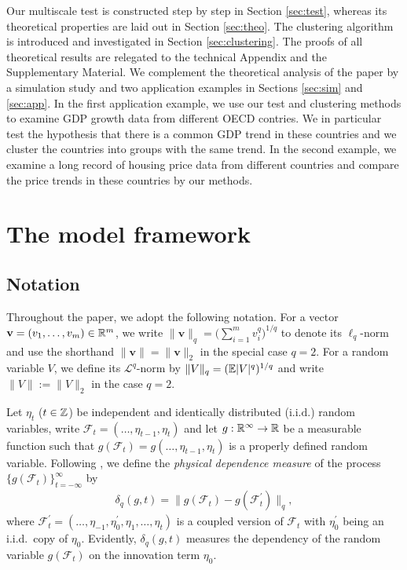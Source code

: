 \documentclass[a4paper,12pt]{article}
\begin{document}
Our multiscale test is constructed step by step in Section \ref{sec:test}, whereas its theoretical properties are laid out in Section \ref{sec:theo}. The clustering algorithm is introduced and investigated in Section \ref{sec:clustering}. The proofs of all theoretical results are relegated to the technical Appendix and the Supplementary Material. We complement the theoretical analysis of the paper by a simulation study and two application examples in Sections \ref{sec:sim} and \ref{sec:app}. In the first application example, we use our test and clustering methods to examine GDP growth data from different OECD contries. We in particular test the hypothesis that there is a common GDP trend in these countries and we cluster the countries into groups with the same trend. In the second example, we examine a long record of housing price data from different countries and compare the price trends in these countries by our methods. 



\section{The model framework}\label{sec:model}


\subsection{Notation}


Throughout the paper, we adopt the following notation. For a vector $\mathbf{v} = (v_1, \ldots, v_m)\in\mathbb{R}^m$, we write $\|\mathbf{v}\|_q = \big(\sum_{i=1}^m v_i^q\big)^{1/q}$ to denote its $\ell_q$-norm and use the shorthand $\|\mathbf{v}\| = \|\mathbf{v}\|_2$ in the special case $q = 2$. For a random variable $V$, we define its $\mathcal{L}^q$-norm by $\|V\|_q = (\mathbb{E} |V|^q)^{1/q}$ and write $\|V\| := \|V\|_2$ in the case $q = 2$.


Let $\eta_t$ ($t \in \mathbb{Z}$) be independent and identically distributed ($\text{i.i.d.}$) random variables, write $\mathcal{F}_t  = (\ldots, \eta_{t-1}, \eta_t)$ and let $g: \mathbb{R}^\infty \to \mathbb{R}$ be a measurable function such that $g(\mathcal{F}_t) = g(\ldots, \eta_{t-1}, \eta_t)$ is a properly defined random variable. Following \cite{Wu2005}, we define the \textit{physical dependence measure} of the process $\{g(\mathcal{F}_t)\}_{t=-\infty}^\infty$ by
\begin{align}\label{eq:physical_dep}
\delta_q(g, t) = \| g(\mathcal{F}_t) - g(\mathcal{F}_t^\prime) \|_q,
\end{align}
where $\mathcal{F}_t^\prime  = (\ldots, \eta_{-1}, \eta^\prime_0, \eta_1, \ldots, \eta_t)$ is a coupled version of $\mathcal{F}_t$ with $\eta_0^\prime$ being an i.i.d.\ copy of $\eta_0$. Evidently, $\delta_q(g, t)$ measures the dependency of the random variable $g(\mathcal{F}_t)$ on the innovation term $\eta_0$. %
\end{document}
